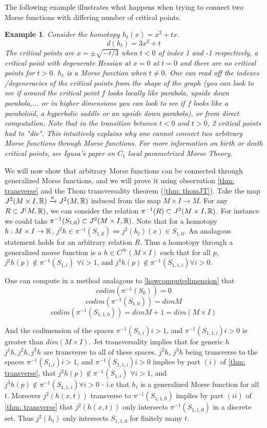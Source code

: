 \documentclass{article}
\newtheorem{example}[theorem]{Example}
\newtheorem{proposed work}[theorem]{Proposed Work}
\begin{document}
The following example illustrates what happens when trying to connect two Morse functions with differing number of critical points.  
\begin{example}
Consider the homotopy $h_t(x)=x^3+tx$.  \[d(h_t)=3x^2+t\]
The critical points are  $x=\pm  \sqrt{-t/3}$ when $t<0$ of index 1 and -1 respectively,  a critical point with degenerate Hessian at $x=0$ at $t=0$ and there are no critical points for $t>0$.  $h_t$ is a Morse function when $t \neq 0$.  One can read off the indexes /degeneracies of the critical points from the shape of the graph (you can look to see if around the critical point $f$ looks locally like parabola, upside down parabola,... or in higher dimensions you can look to see if $f$ looks like a paraboloid, a hyperbolic saddle or an upside down parabola), or from direct computation.  Note that in the transition between $t<0$ and $t>0$, 2 critical points had to "die".  This intuitively explains why one cannot connect two arbitrary Morse functions through Morse functions. For more information on birth or death critical points, see Igusa's paper on $C_1$ local parametrized Morse Theory.

\end{example}

We will now show that arbitrary Morse functions can be connected through generalized Morse functions, and we will prove it using observation \ref{thm: transverse} and the Thom transversality theorem (\ref{thm: thomJT}).  Take the map $J^2(M \times I, \mathbb R) \xrightarrow{\pi}  J^2(M,\mathbb R)$ induced from the map $M \times I  \to M$. For any $R \subset J^(M, \mathbb R)$, we can consider the relation $\pi^{-1}(R) \subset J^2(M \times I, \mathbb R)$.  For instance we could take $\pi^{-1}( S_{1,0}) \subset J^2(M \times I, \mathbb R)$.  Note that for a homotopy $h: M \times I \to \mathbb R$, $j^2 h \in \pi^{-1}(S_{1,0}) \iff j^2(h_t)(x) \in S_{1,0}$.  An analagous statement holds for an arbitrary relation $R$. Thus a homotopy through a generalized morse function is a $h \in C^\infty(M \times I)$ such that for all $p$,  $j^2 h(p) \notin \pi^{-1}(S_{1,i})$ $\forall i>1$, and $j^3 h(p) \notin \pi^{-1}(S_{1,1,i}) \forall i>0$.

One can compute in a method analagous to \ref{howcomputedimension} that 
\[codim (\pi^{-1}(S_{0}))=0 \]
\[codim (\pi^{-1}(S_{1,0}))=dim M \]
\[codim (\pi^{-1}(S_{1,1,0}))=dim M+1=dim(M \times I) \]
 
And the codimension of the spaces
$\pi^{-1}(S_{1,i}) i>1$, and $ \pi^{-1}(S_{1,1,i}) i>0$ is greater than $dim(M \times I)$.  Jet transversality implies that for generic $h$ $j^1h, j^2h, j^3h$ are transverse to all of these spaces.   $j^2h$, $j^3h$ being transverse to the spaces $\pi^{-1}(S_{1,i}) i>1$, and $ \pi^{-1}(S_{1,1,i}) i>0$  implies by part $(i)$ of \ref{thm: transverse}, that $j^2 h(p) \notin \pi^{-1}(S_{1,i})$ $\forall i>1$, and $j^3 h(p) \notin \pi^{-1}(S_{1,1,i}) \forall i>0$ - i.e that $h_t$ is a generalized Morse function for all $t$.   Moreover $j^2(h(x,t))$ transverse to $\pi^{-1}(S_{1,1,0})$ implies by part $(ii)$ of  \ref{thm: transverse} that $j^2(h(x,t))$ only intersects $\pi^{-1}(S_{1,1,0})$ in a discrete set.  Thus $j^2(h_t)$ only intersects $S_{1,1,0}$ for finitely many $t$.
\end{document}

